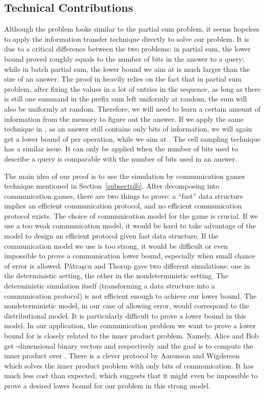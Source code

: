 \documentclass[11pt]{article}
\begin{document}
\subsection{Technical Contributions}\label{subsecttc}
Although the \bps{} problem looks similar to the partial sum problem, it seems hopeless to apply the information transfer technique directly to solve our problem. It is due to a critical difference between the two problems: in partial sum, the lower bound proved roughly equals to the number of bits in the answer to a query; while in batch partial sum, the lower bound we aim at is much larger than the size of an answer. The proof in \cite{PD04a} heavily relies on the fact that in partial sum problem, after fixing the values in a lot of entries in the sequence, as long as there is still one summand in the prefix sum left uniformly at random, the sum will also be uniformly at random. Therefore, we will need to learn a certain amount of information from the memory to figure out the answer. If we apply the same technique in \bps{}, as an answer still contains only  bits of information, we will again get a lower bound of  per operation, while we aim at . The cell sampling technique has a similar issue. It can only be applied when the number of bits used to describe a query is comparable with the number of bits used in an answer. 

The main idea of our proof is to use the simulation by communication games technique mentioned in Section~\ref{subsectplb}. After decomposing into communication games, there are two things to prove: a ``fast'' data structure implies an efficient communication protocol, and no efficient communication protocol exists. The choice of communication model for the game is crucial. If we use a too weak communication model, it would be hard to take advantage of the model to design an efficient protocol given fast data structure. If the communication model we use is too strong, it would be difficult or even impossible to prove a communication lower bound, especially when small chance of error is allowed. P\v{a}tra\c{s}cu and Thorup gave two different simulations: one in the deterministic setting, the other in the nondeterministic setting. The deterministic simulation itself (transforming a data structure into a communication protocol) is not efficient enough to achieve our lower bound. The nondeterministic model, in our case of allowing error, would correspond to the distributional  model. It is particularly difficult to prove a lower bound in this model. In our application, the communication problem we want to prove a lower bound for is closely related to the inner product problem. Namely, Alice and Bob get -dimensional binary vectors  and  respectively and the goal is to compute the inner product  over . There is a clever  protocol by Aaronson and Wigderson~\cite{AW08} which solves the inner product problem with only  bits of communication. It has much less cost than expected, which suggests that it might even be impossible to prove a desired lower bound for our problem in this strong model. 
\end{document}
